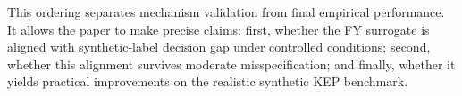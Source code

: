 \documentclass{article}
\begin{document}
This ordering separates mechanism validation from final empirical performance.
It allows the paper to make precise claims: first, whether the FY surrogate is
aligned with synthetic-label decision gap under controlled conditions; second, whether this
alignment survives moderate misspecification; and finally, whether it yields
practical improvements on the realistic synthetic KEP benchmark.



\end{document}
